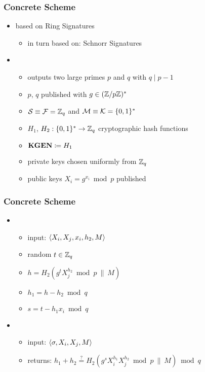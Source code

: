 \begin{frame}
	\frametitle{Concrete Scheme}

	\begin{itemize}[<+->]
		\item based on Ring Signatures
			\begin{itemize}
				\item in turn based on: Schnorr Signatures
			\end{itemize}
		\item \setup 
		\begin{itemize}
			\item outputs two large primes $p$ and $q$ with $q \mid p-1$
			\item $p$, $q$ published with $g\in(\mathbb{Z}/p\mathbb{Z})^\ast$
			\item $\mathcal{S} \equiv \mathcal{F} = \mathbb{Z}_q$ and $\mathcal{M} \equiv \mathcal{K} = \{0,1\}^\ast$
			\item $H_1$, $H_2: \{0,1\}^\ast \to \mathbb{Z}_q$ cryptographic hash functions 
			\item $\textbf{KGEN} \coloneqq H_1$
			\item private keys chosen uniformly from $\mathbb{Z}_q$
			\item public keys $X_i = g^{x_i} \bmod p$ published
		\end{itemize}
	\end{itemize}
\end{frame}

\begin{frame}
	\frametitle{Concrete Scheme}

	\begin{itemize}
		\item \asign
		\begin{itemize}
			\item input: $\langle X_i, X_j, x_i, h_2, M \rangle$
			\item random $t\in\mathbb{Z}_q$
			\item $h = H_2(g^t X_j^{h_2}\bmod p ~\|~ M)$
			\item $h_1 = h - h_2 \bmod q$
			\item $s = t - h_1 x_i \bmod q$
		\end{itemize}
		\item \averify
		\begin{itemize}
			\item input: $\langle \sigma, X_i, X_j, M \rangle$
			\item returns: $h_1 + h_2 \overset{?}{=} H_2(g^s X_{i}^{h_1} X_{j}^{h_2} \bmod p ~\|~ M) \bmod q$
		\end{itemize}
	\end{itemize}
\end{frame}

